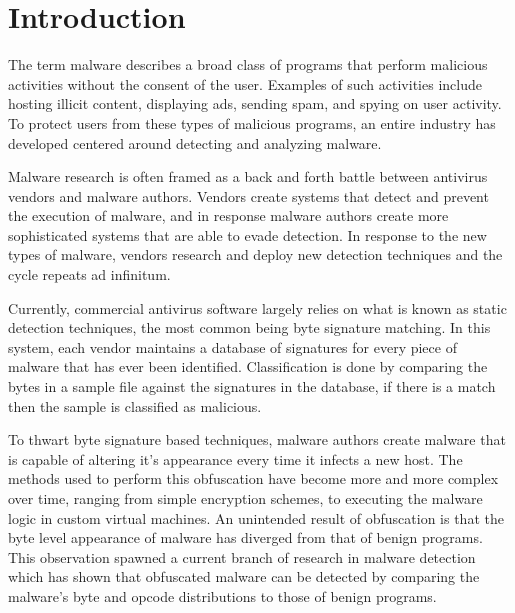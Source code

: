 \chapter{Introduction}

    The term malware describes a broad class of programs that perform malicious
    activities without the consent of the user. Examples of such activities
    include hosting illicit content, displaying ads, sending spam, and spying on
    user activity. 
    To protect users from these types of malicious programs, an
    entire industry has developed centered around detecting and analyzing
    malware.

    Malware research is often framed as a back and forth battle between
    antivirus vendors and malware authors. Vendors create systems that detect
    and prevent the execution of malware, and in response malware authors create
    more sophisticated systems that are able to evade detection. In response to
    the new types of malware, vendors research and deploy new detection
    techniques and the cycle repeats ad infinitum. 

    Currently, commercial antivirus software largely relies on what is known as
    static detection techniques, the most common being byte signature matching.
    In this system, each vendor maintains a database of signatures for every
    piece of malware that has ever been identified. Classification is done by
    comparing the bytes in a sample file against the signatures in the database,
    if there is a match then the sample is classified as malicious.

    To thwart byte signature based techniques, malware authors create malware
    that is capable of altering it's appearance every time it infects a new
    host. The methods used to perform this obfuscation have become more and more
    complex over time, ranging from simple encryption schemes, to executing the
    malware logic in custom virtual machines. An unintended result of
    obfuscation is that the byte level appearance of malware has diverged from
    that of benign programs. This observation spawned a current branch of
    research in malware detection which has shown that obfuscated malware can be
    detected by comparing the malware's byte and opcode distributions to those
    of benign programs.

